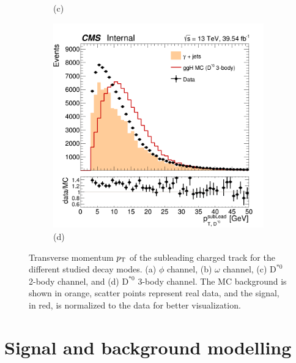 \begin{figure}[!ht]
\begin{subfigure}[t]{0.50\mylength}
        \vspace*{-0.2cm}
        \caption{\footnotesize (c)}
    \end{subfigure}%
    \begin{subfigure}[t]{0.50\mylength}
        \centering
        \includegraphics[width=0.49\mylength]{resources/plots/D0Star_3body_sublead_pt.png}
        \vspace*{-0.2cm}
        \caption{\footnotesize (d)}
    \end{subfigure}%
\caption{Transverse momentum $p_\text{T}$ of the subleading charged track for the different studied decay modes. (a) $\phi$ channel, (b) $\omega$ channel, (c) $\text{D}^{*0}$ 2-body channel, and (d) $\text{D}^{*0}$ 3-body channel. The MC background is shown in orange, scatter points represent real data, and the signal, in red, is normalized to the data for better visualization.}
\label{fig:sublead_pt_data}
    \vspace*{-0.0cm}
\end{figure}

\clearpage

\section{Signal and background modelling}\label{sec:modelling}

